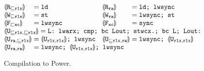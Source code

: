 \begin{figure}[t]
\centering
\small
$\begin{array}{@{}l@{}c@{{}={}}l@{\quad}l@{}c@{{}={}}l@{}}
\compile{\rlab_{\sqsubseteq\rlx}}&&\texttt{ld}&
\compile{\rlab_\ra} && \texttt{ld; lwsync} \\
\compile{\wlab_{\sqsubseteq\rlx}} && \texttt{st} &
\compile{\wlab_\ra} && \texttt{lwsync; st} \\
\compile{\flab_{\sqsubset \sco}}  && \texttt{lwsync} & 
\compile{\flab_\sco} && \texttt{sync} \\
\multicolumn{6}{@{}l@{}}{
\compile{\ulab_{{\sqsubseteq\rlx},{\sqsubseteq\rlx}}} = \texttt{L: lwarx; cmp; bc  Lout; stwcx.; bc  L;  Lout:}}\\ 
\compile{\ulab_{\ra,{\sqsubseteq\rlx}}} && \compile{\ulab_{\rlx,\rlx}} \texttt{; lwsync} &
\compile{\ulab_{{\sqsubseteq\rlx},\ra}} &&  \texttt{lwsync; }\compile{\ulab_{\rlx,\rlx}} \\ 
\compile{\ulab_{\ra,\ra}} &&  \multicolumn{4}{@{}l@{}}{\texttt{lwsync; } \compile{\ulab_{\rlx,\rlx}}\texttt{; lwsync}}
\end{array}$
\caption{Compilation to Power.}
\label{fig:comp}
\end{figure}

